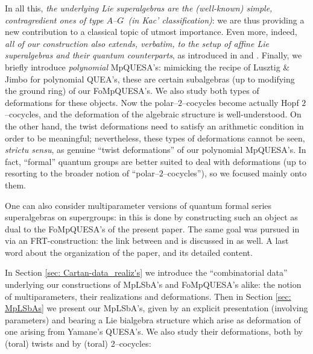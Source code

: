 \documentclass[12pt,reqno,twoside,a4paper]{amsart}
\numberwithin{equation}{section}
\theoremstyle{definition}
\newtheorem{free text}[lema]{}
\theoremstyle{remark}
\theoremstyle{plain}
\begin{document}
 In all this,  \textsl{the underlying Lie superalgebras are the (well-known) simple, contragredient ones of type  $ A $--$ G \, $  (in Kac' classification)\/}:  we are thus providing a new contribution to a classical topic of utmost importance.  Even more, indeed,  \textsl{all of our construction also extends,  \textit{verbatim},  to the setup of  \textit{affine}  Lie superalgebras and their quantum counterparts},  as introduced in  \cite{Ya2}  and  \cite{Ya3}.
%
 \vskip5pt
%
   Finally, we briefly introduce  \textit{polynomial\/}  MpQUESA's: mimicking the recipe of Lusztig \& Jimbo for polynomial QUEA's, these are certain subalgebras (up to modifying the ground ring) of our FoMpQUESA's.  We also study both types of deformations for these objects.  Now the  polar--$ 2 $--cocycles  become actually Hopf  $ 2 $--cocycles,  and the deformation of the algebraic structure is well-understood.  On the other hand, the twist deformations need to satisfy an arithmetic condition in order to be meaningful; nevertheless, these types of deformations cannot be seen,  \textit{strictu sensu},  as genuine ``twist deformations'' of our polynomial MpQUESA's.
 In fact, ``formal'' quantum groups are better suited to deal with deformations (up to resorting to the broader notion of ``polar--$ 2 $--cocycles''),  so we focused mainly onto them.
                                                                  \par
   One can also consider multiparameter versions of quantum formal series superalgebras on supergroups: in  \cite{GP}  this is done by constructing such an object as dual to the FoMpQUESA's of the present paper.  The same goal was pursued in  \cite{Ma}  via an FRT-construction: the link between  \cite{Ma}  and  \cite{GP}  is discussed in  \cite{GP}  as well.
%
 \vskip5pt
%
   A last word about the organization of the paper, and its detailed content.
                                                                  \par
   In  Section \ref{sec: Cartan-data_realiz's}  we introduce the ``combinatorial data'' underlying our constructions of MpLSbA's and FoMpQUESA's alike: the notion of multiparameters, their realizations and deformations.  Then in  Section \ref{sec: MpLSbAs}  we present our MpLSbA's, given by an explicit presentation (involving parameters) and bearing a Lie bialgebra structure which arise as deformation of one arising from Yamane's QUESA's.  We also study their deformations, both by (toral) twists and by (toral) 2--cocycles:
\end{document}
